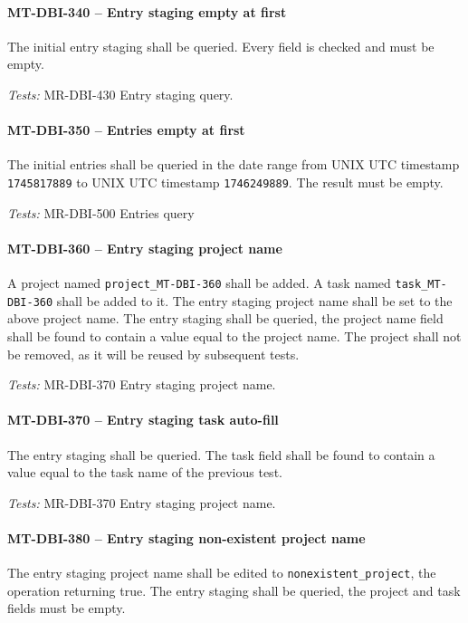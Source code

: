 \paragraph{MT-DBI-340 -- Entry staging empty at first}
The initial entry staging shall be queried.
Every field is checked and must be empty.

\textit{Tests: } MR-DBI-430 Entry staging query.

\paragraph{MT-DBI-350 -- Entries empty at first}
The initial entries shall be queried in the date range
from UNIX UTC timestamp \lstinline{1745817889}
to UNIX UTC timestamp \lstinline{1746249889}. The result must
be empty.

\textit{Tests: } MR-DBI-500 Entries query

\paragraph{MT-DBI-360 -- Entry staging project name}
A project named \lstinline{project_MT-DBI-360} shall be added.
A task named \lstinline{task_MT-DBI-360} shall be added to it.
The entry staging project name shall be set to the above project name.
The entry staging shall be queried, the project name field shall
be found to contain a value equal to the project name.
The project shall not be removed, as it will be reused by subsequent tests.

\textit{Tests: } MR-DBI-370 Entry staging project name.

\paragraph{MT-DBI-370 -- Entry staging task auto-fill}
The entry staging shall be queried. The task field shall be found
to contain a value equal to the task name of the previous test.

\textit{Tests: } MR-DBI-370 Entry staging project name.

\paragraph{MT-DBI-380 -- Entry staging non-existent project name}
The entry staging project name shall be edited to
\lstinline{nonexistent_project}, the operation returning true.
The entry staging shall be queried, the project and task fields
must be empty.

